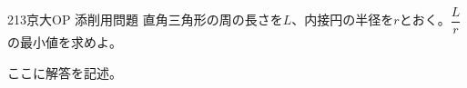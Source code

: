 \begin{prob}{213}{}{京大OP 添削用問題}
 直角三角形の周の長さを$L$、内接円の半径を$r$とおく。$\dfrac{L}{r}$の最小値を求めよ。
\end{prob}
ここに解答を記述。